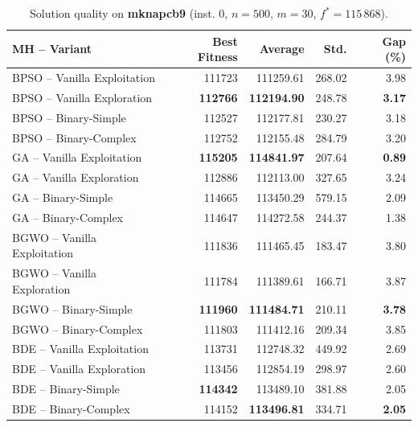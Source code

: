 \documentclass[journal,article,submit,moreauthors]{Definitions/mdpi}
\begin{document}
\begin{table}[htbp]
  \centering
  \small
  \caption{Solution quality on \textbf{mknapcb9} (inst. 0, $n=500$, $m=30$, $f^*=115\,868$).}
  \label{tab:calidad_mknapcb9_0}
  \begin{tabular}{lrrrr}
    \toprule
    \textbf{MH -- Variant} &
    \textbf{Best Fitness} &
    \textbf{Average} &
    \textbf{Std.} &
    \textbf{Gap (\%)} \\
    \midrule
    BPSO -- Vanilla Exploitation &         111723 &        111259.61 & 268.02 &         3.98 \\
    BPSO -- Vanilla Exploration  & \textbf{112766} & \textbf{112194.90} & 248.78 & \textbf{3.17} \\
    BPSO -- Binary-Simple        &         112527 &        112177.81 & 230.27 &         3.18 \\
    BPSO -- Binary-Complex       &         112752 &        112155.48 & 284.79 &         3.20 \\
    \midrule
    GA -- Vanilla Exploitation   & \textbf{115205} & \textbf{114841.97} & 207.64 & \textbf{0.89} \\
    GA -- Vanilla Exploration    &         112886 &        112113.00 & 327.65 &         3.24 \\
    GA -- Binary-Simple          &         114665 &        113450.29 & 579.15 &         2.09 \\
    GA -- Binary-Complex         &         114647 &        114272.58 & 244.37 &         1.38 \\
    \midrule
    BGWO -- Vanilla Exploitation &         111836 &        111465.45 & 183.47 &         3.80 \\
    BGWO -- Vanilla Exploration  &         111784 &        111389.61 & 166.71 &         3.87 \\
    BGWO -- Binary-Simple        & \textbf{111960} & \textbf{111484.71} & 210.11 & \textbf{3.78} \\
    BGWO -- Binary-Complex       &         111803 &        111412.16 & 209.34 &         3.85 \\
    \midrule
    BDE -- Vanilla Exploitation  &         113731 &        112748.32 & 449.92 &         2.69 \\
    BDE -- Vanilla Exploration   &         113456 &        112854.19 & 298.97 &         2.60 \\
    BDE -- Binary-Simple         & \textbf{114342} &        113489.10 & 381.88 &         2.05 \\
    BDE -- Binary-Complex        &         114152 & \textbf{113496.81} & 334.71 & \textbf{2.05} \\
    \bottomrule
  \end{tabular}
\end{table}
\end{document}
